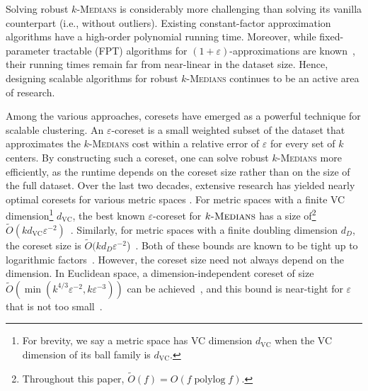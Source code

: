 \documentclass[11pt,letterpaper]{article}
\theoremstyle{definition}
\newcommand{\eps}{\varepsilon}
\newcommand{\VC}{\ensuremath{\mathrm{VC}}}
\newcommand{\ProblemName}[1]{\textsc{#1}}
\newcommand{\kMedian}{\ProblemName{$k$-Medians}\xspace}
\DeclareMathOperator{\polylog}{polylog}
\begin{document}
Solving robust \kMedian is considerably more challenging than solving its vanilla counterpart (i.e., without outliers). Existing constant-factor approximation algorithms \cite{chen2008constant,krishnaswamy2018constant,gupta2024structural} have a high-order polynomial running time. Moreover, while fixed-parameter tractable (FPT) algorithms for $(1+\eps)$-approximations are known~\cite{feng2019improved,agrawal2023clustering},
their running times remain far from near-linear in the dataset size. Hence, designing scalable algorithms for robust \kMedian continues to be an active area of research.

Among the various approaches, coresets have emerged as a powerful technique for scalable clustering. An $\eps$-coreset is a small weighted subset of the dataset that approximates the \kMedian cost within a relative error of $\eps$ for every set of $k$ centers.
By constructing such a coreset, one can solve robust \kMedian more efficiently, as the runtime depends on the coreset size rather than on the size of the full dataset.
Over the last two decades, extensive research has yielded nearly optimal coresets for various metric spaces \cite{DBLP:journals/dcg/Har-PeledK07,Chen09,langberg2010universal,DBLP:conf/stoc/FeldmanL11,cohen2021new,Cohen2022Towards,cohen2022improved,huang2024optimal,bansal2024sensitivity,Cohen25}. 
For metric spaces with a finite VC dimension\footnote{For brevity, we say a metric space has VC dimension $d_{\VC}$ when the VC dimension of its ball family is $d_{\VC}$.} $d_{\VC}$, the best known $\eps$-coreset for $\kMedian$ has a size of\footnote{Throughout this paper, $\tilde{O}(f) = O(f\polylog f)$.} $\tilde{O}(kd_{\VC}\eps^{-2})$~\cite{Cohen25}. Similarly, for metric spaces with a finite doubling dimension $d_D$, the coreset size is $\tilde{O}(kd_D\eps^{-2}$)~\cite{cohen2021new}. Both of these bounds are known to be tight up to logarithmic factors~\cite{Cohen2022Towards}.
However, the coreset size need not always depend on the dimension. In Euclidean space, a dimension-independent coreset of size $\tilde{O}(\min(k^{4/3} \eps^{-2}, k\eps^{-3}))$ can be achieved~\cite{Cohen2022Towards,cohen2022improved}, and this bound is near-tight for $\eps$ that is not too small~\cite{huang2024optimal}.
\end{document}
